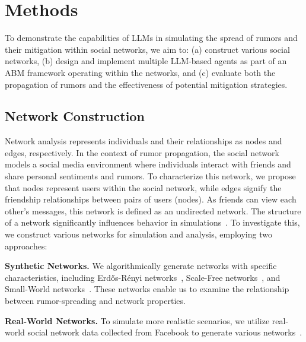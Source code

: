 \section{Methods}
\label{sec:approach}

To demonstrate the capabilities of LLMs in simulating the spread of rumors and their mitigation within social networks, we aim to: 
(a) construct various social networks, 
(b) design and implement multiple LLM-based agents as part of an ABM framework operating within the networks, and 
(c) evaluate both the propagation of rumors and the effectiveness of potential mitigation strategies.

\subsection{Network Construction}
Network analysis represents individuals and their relationships as nodes and edges, respectively.
In the context of rumor propagation, the social network models a social media environment where individuals interact with friends and share personal sentiments and rumors. 
To characterize this network, we propose that nodes represent users within the social network, while edges signify the friendship relationships between pairs of users (nodes). 
As friends can view each other’s messages, this network is defined as an undirected network.
The structure of a network significantly influences behavior in simulations~\cite{Alam2011}. 
To investigate this, we construct various networks for simulation and analysis, employing two approaches:

\noindent\textbf{Synthetic Networks.} 
We algorithmically generate networks with specific characteristics, including Erdős-Rényi networks~\cite{erdos1959random}, Scale-Free networks~\cite{barabasi2003scale}, and Small-World networks~\cite{watts1998collective}. 
These networks enable us to examine the relationship between rumor-spreading and network properties.

\noindent\textbf{Real-World Networks.} 
To simulate more realistic scenarios, we utilize real-world social network data collected from Facebook to generate various networks~\cite{leskovec2012learning}.

